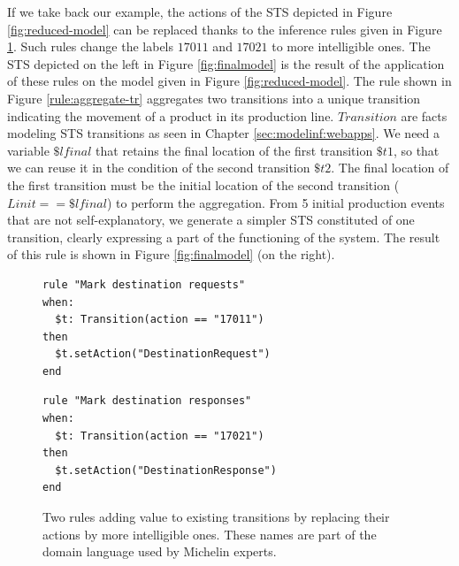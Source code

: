 \begin{example}
If we take back our example, the actions of the STS depicted in
Figure \ref{fig:reduced-model} can be replaced thanks to the
inference rules given in Figure \ref{rule:rename-tr}. Such rules
change the labels $17011$ and $17021$ to more intelligible ones.
The STS depicted on the left in Figure \ref{fig:finalmodel} is
the result of the application of these rules on the model given
in Figure \ref{fig:reduced-model}.
The rule shown in Figure \ref{rule:aggregate-tr} aggregates
two transitions into a unique transition indicating the movement
of a product in its production line. $Transition$ are facts
modeling STS transitions as seen in Chapter 
\ref{sec:modelinf:webapps}. We need a variable $\$lfinal$ that
retains the final location of the first transition $\$t1$, so
that we can reuse it in the condition of the second transition
$\$t2$. The final location of the first transition must be the
initial location of the second transition ($Linit == \$lfinal$)
to perform the aggregation. From 5 initial production events
that are not self-explanatory, we generate a simpler STS
constituted of one transition, clearly expressing a part of the
functioning of the system. The result of this rule is shown in
Figure \ref{fig:finalmodel} (on the right).
\end{example}

\begin{figure}[ht]
\begin{framed}
\begin{BVerbatim}
rule "Mark destination requests"
when:
  $t: Transition(action == "17011")
then
  $t.setAction("DestinationRequest")
end
\end{BVerbatim}
\end{framed}

\begin{framed}
\begin{BVerbatim}
rule "Mark destination responses"
when:
  $t: Transition(action == "17021")
then
  $t.setAction("DestinationResponse")
end
\end{BVerbatim}
\end{framed}

  \caption{Two rules adding value to existing transitions by
  replacing their actions by more intelligible ones. These names
  are part of the domain language used by Michelin experts.}
  \label{rule:rename-tr}
\end{figure}

